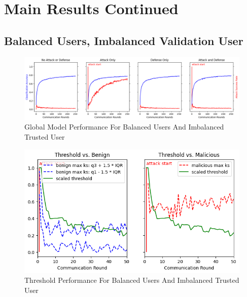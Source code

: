\documentclass{article} %
\begin{document}
%



%
\appendix

%
\section{Main Results Continued}

%
\subsection{Balanced Users, Imbalanced Validation User}
\label{sec.imbal_val}

\begin{figure}[H]
    \centering
    \includegraphics[width=\textwidth]{01_trusted/centralized/alpha10000--alpha_val1/visuals/accuracy--n_malicious1--m_start1.png}
    \caption{Global Model Performance For Balanced Users And Imbalanced Trusted User}
    \label{fig:centralized--alpha10000--alpha_val1--accuracy--n_malicious1--m_start1}
\end{figure}

\begin{figure}[H]
    \centering
    \includegraphics[width=.75\textwidth]{01_trusted/centralized/alpha10000--alpha_val1/visuals/threshold--n_malicious1--m_start1--d_rounds50.png}
    \caption{Threshold Performance For Balanced Users And Imbalanced Trusted User}
    \label{fig:centralized--alpha10000--alpha_val1--threshold--n_malicious1--m_start1--d_rounds50}
\end{figure}
\end{document}
